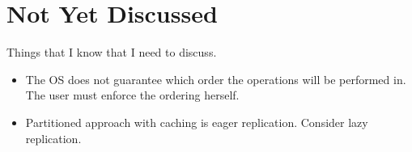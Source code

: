 \documentclass[a4paper,twoside]{report} %
\begin{document}
\chapter{Not Yet Discussed}\label{chap:nyd}

Things that I know that I need to discuss.

\begin{itemize}

\item The OS does not guarantee which order the operations will be
  performed in. The user must enforce the ordering herself.

\item Partitioned approach with caching is eager replication. Consider
  lazy replication.
\end{itemize}



\end{document}
